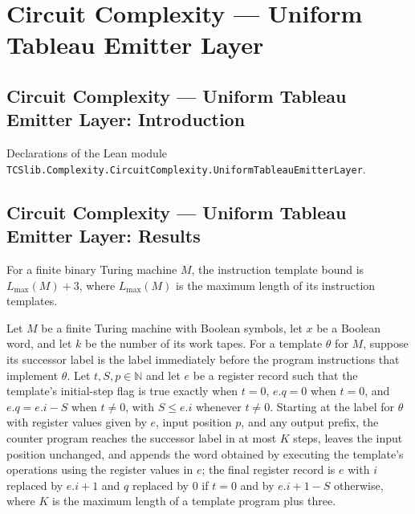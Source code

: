 \section{Circuit Complexity --- Uniform Tableau Emitter Layer}
\subsection*{Circuit Complexity --- Uniform Tableau Emitter Layer: Introduction}

Declarations of the Lean module \texttt{TCSlib.Complexity.CircuitComplexity.UniformTableauEmitterLayer}.

\subsection*{Circuit Complexity --- Uniform Tableau Emitter Layer: Results}

\begin{definition}
\label{Complexity.UTab.Ki}
\leanok
{}
For a finite binary Turing machine $M$, the instruction template bound is
$L_{\max}(M)+3$, where $L_{\max}(M)$ is the maximum length of its instruction templates.
\end{definition}

\begin{theorem}
\label{Complexity.UTab.goes_instr_inv}
\leanok
{}
Let $M$ be a finite Turing machine with Boolean symbols, let $x$ be a Boolean word, and
let $k$ be the number of its work tapes. For a template $\theta$ for $M$, suppose its
successor label is the label immediately before the program instructions that implement
$\theta$. Let $t,S,p\in\mathbb{N}$ and let $e$ be a register record such that the
template's initial-step flag is true exactly when $t=0$, $e.q=0$ when $t=0$, and
$e.q=e.i-S$ when $t\ne 0$, with $S\le e.i$ whenever $t\ne 0$. Starting at the label for
$\theta$ with register values given by $e$, input position $p$, and any output prefix,
the counter program reaches the successor label in at most $K$ steps, leaves the input
position unchanged, and appends the word obtained by executing the template's operations
using the register values in $e$; the final register record is $e$ with $i$ replaced by
$e.i+1$ and $q$ replaced by $0$ if $t=0$ and by $e.i+1-S$ otherwise, where $K$ is the
maximum length of a template program plus three.
\end{theorem}

